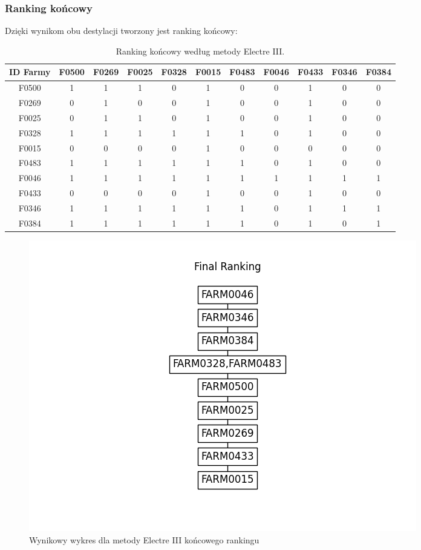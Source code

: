 \documentclass[11pt]{article}
\begin{document}
\subsubsection{Ranking końcowy}
Dzięki wynikom obu destylacji tworzony jest ranking końcowy:
\begin{table}[H]
\centering
\begin{tabular}{|c||c|c|c|c|c|c|c|c|c|c|}
\hline
\textbf{ID Farmy} & \textbf{F0500} & \textbf{F0269} & \textbf{F0025} & \textbf{F0328} & \textbf{F0015} & \textbf{F0483} & \textbf{F0046} & \textbf{F0433} & \textbf{F0346} & \textbf{F0384} \\
\hline
F0500 & 1 & 1 & 1 & 0 & 1 & 0 & 0 & 1 & 0 & 0 \\
\hline
F0269 & 0 & 1 & 0 & 0 & 1 & 0 & 0 & 1 & 0 & 0 \\
\hline
F0025 & 0 & 1 & 1 & 0 & 1 & 0 & 0 & 1 & 0 & 0 \\
\hline
F0328 & 1 & 1 & 1 & 1 & 1 & 1 & 0 & 1 & 0 & 0 \\
\hline
F0015 & 0 & 0 & 0 & 0 & 1 & 0 & 0 & 0 & 0 & 0 \\
\hline
F0483 & 1 & 1 & 1 & 1 & 1 & 1 & 0 & 1 & 0 & 0 \\
\hline
F0046 & 1 & 1 & 1 & 1 & 1 & 1 & 1 & 1 & 1 & 1 \\
\hline
F0433 & 0 & 0 & 0 & 0 & 1 & 0 & 0 & 1 & 0 & 0 \\
\hline
F0346 & 1 & 1 & 1 & 1 & 1 & 1 & 0 & 1 & 1 & 1 \\
\hline
F0384 & 1 & 1 & 1 & 1 & 1 & 1 & 0 & 1 & 0 & 1 \\
\hline
\end{tabular}
\caption{Ranking końcowy według metody Electre III.}
\end{table}

\begin{figure}[H]
	\centering
	\includegraphics[scale=0.75]{output/Final Ranking.png}
	\caption{Wynikowy wykres dla metody Electre III końcowego rankingu}
\end{figure}
\end{document}
